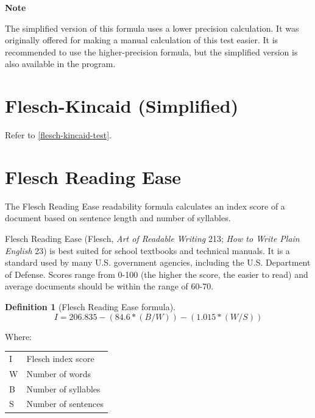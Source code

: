 \documentclass[
]{book}
\newenvironment{notesection}
    {
    \begin{tcolorbox}[colframe=mediumblue,colback=lightblue,coltext=mediumblue,arc=3mm]
    \faLightbulb[regular] \textbf{Note} \newline
    }
    {
    \end{tcolorbox}
    }
\theoremstyle{definition}
\newtheorem{definition}{Definition}[chapter]
\theoremstyle{definition}
\theoremstyle{definition}
\theoremstyle{definition}
\theoremstyle{remark}
\begin{document}
\begin{notesection}
The simplified version of this formula uses a lower precision calculation. It was originally offered for making a manual calculation of this test easier. It is recommended to use the higher-precision formula, but the simplified version is also available in the program.

\end{notesection}


\hypertarget{flesch-kincaid-test-simplified}{%
\section{\texorpdfstring{Flesch-Kincaid (Simplified)}{Flesch-Kincaid (Simplified)}}\label{flesch-kincaid-test-simplified}}

Refer to \ref{flesch-kincaid-test}.

\newpage

\hypertarget{flesch-test}{%
\section{\texorpdfstring{Flesch Reading Ease}{Flesch Reading Ease}}\label{flesch-test}}

The Flesch Reading Ease readability formula calculates an index score of a document based on sentence length and number of syllables.

Flesch Reading Ease (Flesch, \emph{Art of Readable Writing} 213; \emph{How to Write Plain English} 23) is best suited for school textbooks and technical manuals. It is a standard used by many U.S. government agencies, including the U.S. Department of Defense. Scores range from 0-100 (the higher the score, the easier to read) and average documents should be within the range of 60-70.

\begin{definition}[Flesch Reading Ease formula]
\protect\hypertarget{def:flesch}{}{\label{def:flesch} {} }\[
I = 206.835 - (84.6*(B/W)) - (1.015*(W/S))
\]
\end{definition}

Where:

\begin{longtable}[]{@{}
  >{\raggedright\arraybackslash}p{}
  >{\raggedright\arraybackslash}p{}@{}}
\toprule
\endhead
I & Flesch index score \\
W & Number of words \\
B & Number of syllables \\
S & Number of sentences \\
\bottomrule
\end{longtable}
\end{document}
